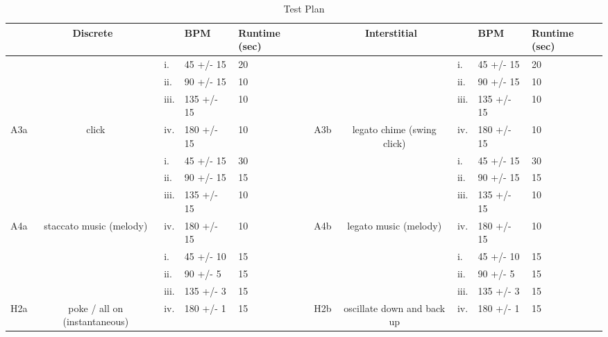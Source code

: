 \begin{table}[t]
{\begin{tabular}{cclllcclll}
        \multicolumn{3}{c}{Discrete} & BPM & \multicolumn{1}{l|}{Runtime (sec)} & \multicolumn{3}{c}{Interstitial} & BPM & Runtime (sec) \\ \hline
        &  & i. & 45 +/- 15 & \multicolumn{1}{l|}{20} &  &  & i. & 45 +/- 15 & 20 \\
        &  & ii. & 90 +/- 15 & \multicolumn{1}{l|}{10} &  &  & ii. & 90 +/- 15 & 10 \\
        &  & iii. & 135 +/- 15 & \multicolumn{1}{l|}{10} &  &  & iii. & 135 +/- 15 & 10 \\
        \multirow{-4}{*}{A3a} & \multirow{-4}{*}{click} & iv. & 180 +/- 15 & \multicolumn{1}{l|}{10} & \multirow{-4}{*}{A3b} & \multirow{-4}{*}{legato chime (swing click)} & iv. & 180 +/- 15 & 10 \\ \hline
        &  & i. & 45 +/- 15 & \multicolumn{1}{l|}{30} &  &  & i. & 45 +/- 15 & 30 \\
        &  & ii. & 90 +/- 15 & \multicolumn{1}{l|}{15} &  &  & ii. & 90 +/- 15 & 15 \\
        &  & iii. & 135 +/- 15 & \multicolumn{1}{l|}{10} &  &  & iii. & 135 +/- 15 & 10 \\
        \multirow{-4}{*}{A4a} & \multirow{-4}{*}{staccato music (melody)} & iv. & 180 +/- 15 & \multicolumn{1}{l|}{10} & \multirow{-4}{*}{A4b} & \multirow{-4}{*}{legato music (melody)} & iv. & 180 +/- 15 & 10 \\ \hline
        &  & i. & 45 +/- 10 & \multicolumn{1}{l|}{15} &  &  & i. & 45 +/- 10 & 15 \\
        &  & ii. & 90 +/- 5 & \multicolumn{1}{l|}{15} &  &  & ii. & 90 +/- 5 & 15 \\
        &  & iii. & 135 +/- 3 & \multicolumn{1}{l|}{15} &  &  & iii. & 135 +/- 3 & 15 \\
        \multirow{-4}{*}{H2a} & \multirow{-4}{*}{poke / all on (instantaneous)} & iv. & 180 +/- 1 & \multicolumn{1}{l|}{15} & \multirow{-4}{*}{H2b} & \multirow{-4}{*}{oscillate down and back up} & iv. & 180 +/- 1 & 15 \\ \hline
        \end{tabular}%
    }
    \caption{Test Plan}
    \label{fig:TestPlan}
\end{table}

